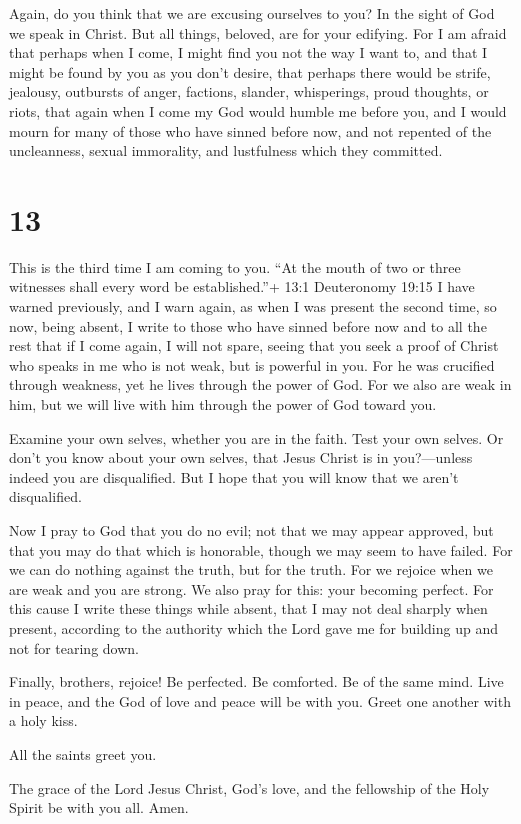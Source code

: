  Again, do you think that we are excusing ourselves to you?
In the sight of God we speak in Christ. But all things, beloved, are for
your edifying.  For I am afraid that perhaps when I come, I
might find you not the way I want to, and that I might be found by you
as you don't desire, that perhaps there would be strife, jealousy,
outbursts of anger, factions, slander, whisperings, proud thoughts, or
riots,  that again when I come my God would humble me
before you, and I would mourn for many of those who have sinned before
now, and not repented of the uncleanness, sexual immorality, and
lustfulness which they committed.

\hypertarget{section-12}{%
\section{13}\label{section-12}}

 This is the third time I am coming to you. ``At the mouth
of two or three witnesses shall every word be established.''+ 13:1
Deuteronomy 19:15  I have warned previously, and I warn
again, as when I was present the second time, so now, being absent, I
write to those who have sinned before now and to all the rest that if I
come again, I will not spare,  seeing that you seek a proof
of Christ who speaks in me who is not weak, but is powerful in you.
 For he was crucified through weakness, yet he lives through
the power of God. For we also are weak in him, but we will live with him
through the power of God toward you.

 Examine your own selves, whether you are in the faith. Test
your own selves. Or don't you know about your own selves, that Jesus
Christ is in you?---unless indeed you are disqualified.  But
I hope that you will know that we aren't disqualified.

 Now I pray to God that you do no evil; not that we may
appear approved, but that you may do that which is honorable, though we
may seem to have failed.  For we can do nothing against the
truth, but for the truth.  For we rejoice when we are weak
and you are strong. We also pray for this: your becoming perfect.
 For this cause I write these things while absent, that I
may not deal sharply when present, according to the authority which the
Lord gave me for building up and not for tearing down.

 Finally, brothers, rejoice! Be perfected. Be comforted. Be
of the same mind. Live in peace, and the God of love and peace will be
with you.  Greet one another with a holy kiss.

 All the saints greet you.

 The grace of the Lord Jesus Christ, God's love, and the
fellowship of the Holy Spirit be with you all. Amen.
